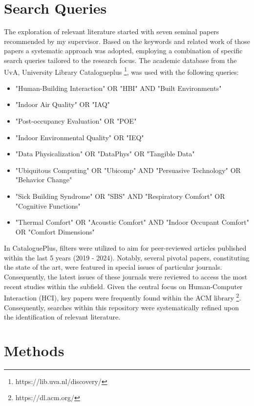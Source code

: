 \section{Search Queries}

The exploration of relevant literature started with seven seminal papers recommended by my supervisor. Based on the keywords and related work of those papers a systematic approach was adopted, employing a combination of specific search queries tailored to the research focus. The academic database from the UvA, University Library Catalogueplus \footnote{https://lib.uva.nl/discovery/}, was used with the following queries:

\begin{itemize}
    \item "Human-Building Interaction" OR "HBI" AND "Built Environments"
    \item "Indoor Air Quality" OR "IAQ"
    \item "Post-occupancy Evaluation" OR "POE"
    \item "Indoor Environmental Quality" OR "IEQ"
    \item "Data Physicalization" OR "DataPhys" OR "Tangible Data"
    \item "Ubiquitous Computing" OR "Ubicomp" AND "Persuasive Technology" OR "Behavior Change"
    \item "Sick Building Syndrome" OR "SBS" AND "Respiratory Comfort" OR "Cognitive Functions"
    \item "Thermal Comfort" OR "Acoustic Comfort" AND "Indoor Occupant Comfort" OR "Comfort Dimensions"
\end{itemize}

In CataloguePlus, filters were utilized to aim for peer-reviewed articles published within the last 5 years (2019 - 2024). Notably, several pivotal papers, constituting the state of the art, were featured in special issues of particular journals. Consequently, the latest issues of these journals were reviewed to access the most recent studies within the subfield. Given the central focus on Human-Computer Interaction (HCI), key papers were frequently found within the ACM library \footnote{https://dl.acm.org/}. Consequently, searches within this repository were systematically refined upon the identification of relevant literature.

\section{Methods}

